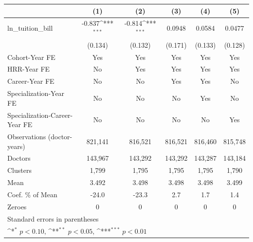 {
\def\sym#1{\ifmmode^{#1}\else\(^{#1}\)\fi}
\begin{tabular}{l*{5}{c}}
\hline\hline
                    &\multicolumn{1}{c}{(1)}         &\multicolumn{1}{c}{(2)}         &\multicolumn{1}{c}{(3)}         &\multicolumn{1}{c}{(4)}         &\multicolumn{1}{c}{(5)}         \\
\hline
ln\_tuition\_bill     &      -0.837\sym{***}&      -0.814\sym{***}&      0.0948         &      0.0584         &      0.0477         \\
                    &     (0.134)         &     (0.132)         &     (0.171)         &     (0.133)         &     (0.128)         \\
[1em]
Cohort-Year FE      &         Yes         &         Yes         &         Yes         &         Yes         &         Yes         \\
[1em]
HRR-Year FE         &          No         &         Yes         &         Yes         &         Yes         &         Yes         \\
[1em]
Career-Year FE      &          No         &          No         &         Yes         &         Yes         &          No         \\
[1em]
Specialization-Year FE&          No         &          No         &          No         &         Yes         &          No         \\
[1em]
Specialization-Career-Year FE&          No         &          No         &          No         &          No         &         Yes         \\
\hline
Observations (doctor-years)&     821,141         &     816,521         &     816,521         &     816,460         &     815,748         \\
Doctors             &     143,967         &     143,292         &     143,292         &     143,287         &     143,184         \\
Clusters            &       1,799         &       1,795         &       1,795         &       1,795         &       1,790         \\
Mean                &       3.492         &       3.498         &       3.498         &       3.498         &       3.499         \\
Coef. \% of Mean    &       -24.0         &       -23.3         &         2.7         &         1.7         &         1.4         \\
Zeroes              &           0         &           0         &           0         &           0         &           0         \\
\hline\hline
\multicolumn{6}{l}{\footnotesize Standard errors in parentheses}\\
\multicolumn{6}{l}{\footnotesize \sym{*} \(p<0.10\), \sym{**} \(p<0.05\), \sym{***} \(p<0.01\)}\\
\end{tabular}
}
